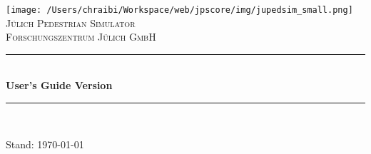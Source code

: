 %
\newcommand{\HRule}{\rule{\linewidth}{0.5mm}}
\begin{titlepage}
\begin{center}

\texttt{[image: /Users/chraibi/Workspace/web/jpscore/img/jupedsim\_small.png]}\\[1cm]

\textsc{\LARGE J\"ulich Pedestrian Simulator}\\[1.5cm]

\textsc{\small Forschungszentrum J\"ulich GmbH}\\[0.5cm]


\HRule \\[0.4cm]
{ \huge \bfseries User's Guide Version \Version}\\[0.4cm]

\HRule \\[1.5cm]


\begin{minipage}{0.4\textwidth}
\begin{flushright} \large
\end{flushright}
\end{minipage}

\vfill
{\large Stand: \today}
\end{center}
\end{titlepage}
